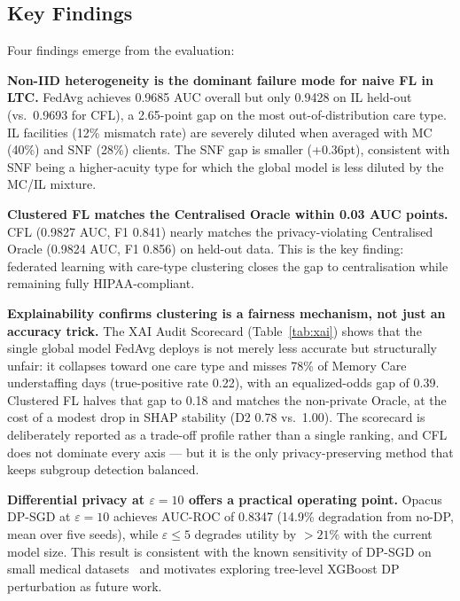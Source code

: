 \documentclass[journal]{IEEEtran}
\begin{document}
\subsection{Key Findings}
Four findings emerge from the evaluation:

\textbf{Non-IID heterogeneity is the dominant failure mode for naive FL in LTC.}
FedAvg achieves 0.9685 AUC overall but only 0.9428 on IL held-out (vs.\ 0.9693 for CFL),
a 2.65-point gap on the most out-of-distribution care type. IL facilities (12\% mismatch
rate) are severely diluted when averaged with MC (40\%) and SNF (28\%) clients.
The SNF gap is smaller (+0.36pt), consistent with SNF being a higher-acuity type
for which the global model is less diluted by the MC/IL mixture.

\textbf{Clustered FL matches the Centralised Oracle within 0.03 AUC points.}
CFL (0.9827 AUC, F1 0.841) nearly matches the privacy-violating Centralised
Oracle (0.9824 AUC, F1 0.856) on held-out data. This is the key finding:
federated learning with care-type clustering closes the gap to centralisation
while remaining fully HIPAA-compliant.

\textbf{Explainability confirms clustering is a fairness mechanism, not just an accuracy trick.}
The XAI Audit Scorecard (Table~\ref{tab:xai}) shows that the single global model
FedAvg deploys is not merely less accurate but structurally unfair: it collapses
toward one care type and misses 78\% of Memory Care understaffing days
(true-positive rate 0.22), with an equalized-odds gap of 0.39. Clustered FL halves
that gap to 0.18 and matches the non-private Oracle, at the cost of a modest drop
in SHAP stability (D2 0.78 vs.\ 1.00). The scorecard is deliberately reported as a
trade-off profile rather than a single ranking, and CFL does not dominate every
axis --- but it is the only privacy-preserving method that keeps subgroup
detection balanced.

\textbf{Differential privacy at $\varepsilon = 10$ offers a practical operating point.}
Opacus DP-SGD at $\varepsilon = 10$ achieves AUC-ROC of 0.8347 (14.9\%
degradation from no-DP, mean over five seeds), while $\varepsilon \leq 5$ degrades
utility by $> 21\%$ with the current model size. This result is consistent with the
known sensitivity of DP-SGD on small medical datasets~\cite{geyer2017} and
motivates exploring tree-level XGBoost DP perturbation as future work.
\end{document}
